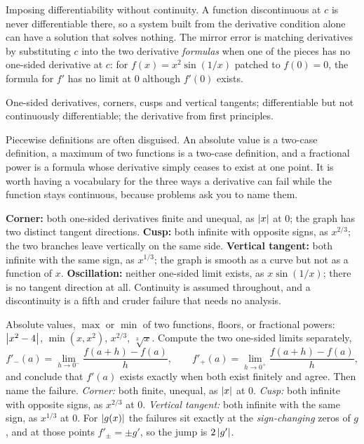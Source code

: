 \begin{trap}
Imposing differentiability without continuity. A function discontinuous at $c$ is never differentiable there, so a system built from the derivative condition alone can have a solution that solves nothing. The mirror error is matching derivatives by substituting $c$ into the two derivative \emph{formulas} when one of the pieces has no one-sided derivative at $c$: for $f(x)=x^{2}\sin(1/x)$ patched to $f(0)=0$, the formula for $f'$ has no limit at $0$ although $f'(0)$ exists.
\end{trap}

\begin{seealsob}One-sided derivatives, corners, cusps and vertical tangents; differentiable but not continuously differentiable; the derivative from first principles.\end{seealsob}

Piecewise definitions are often disguised. An absolute value is a two-case definition, a maximum of two functions is a two-case definition, and a fractional power is a formula whose derivative simply ceases to exist at one point. It is worth having a vocabulary for the three ways a derivative can fail while the function stays continuous, because problems ask you to name them.

\begin{keynote}
\textbf{Corner:} both one-sided derivatives finite and unequal, as $\left\lvert x\right\rvert$ at $0$; the graph has two distinct tangent directions. \textbf{Cusp:} both infinite with opposite signs, as $x^{2/3}$; the two branches leave vertically on the same side. \textbf{Vertical tangent:} both infinite with the same sign, as $x^{1/3}$; the graph is smooth as a curve but not as a function of $x$. \textbf{Oscillation:} neither one-sided limit exists, as $x\sin(1/x)$; there is no tangent direction at all. Continuity is assumed throughout, and a discontinuity is a fifth and cruder failure that needs no analysis.
\end{keynote}

\cue Absolute values, $\max$ or $\min$ of two functions, floors, or fractional powers: $\left\lvert x^{2}-4\right\rvert$, $\min(x,x^{2})$, $x^{2/3}$, $\sqrt[3]{x}$.
\method Compute the two one-sided limits separately,
\[
f'_{-}(a)=\lim_{h\to0^{-}}\frac{f(a+h)-f(a)}{h},\qquad f'_{+}(a)=\lim_{h\to0^{+}}\frac{f(a+h)-f(a)}{h},
\]
and conclude that $f'(a)$ exists exactly when both exist finitely and agree. Then name the failure. \emph{Corner:} both finite, unequal, as $\left\lvert x\right\rvert$ at $0$. \emph{Cusp:} both infinite with opposite signs, as $x^{2/3}$ at $0$. \emph{Vertical tangent:} both infinite with the same sign, as $x^{1/3}$ at $0$. For $\left\lvert g(x)\right\rvert$ the failures sit exactly at the \emph{sign-changing} zeros of $g$, and at those points $f'_{\pm}=\pm g'$, so the jump is $2\left\lvert g'\right\rvert$.

